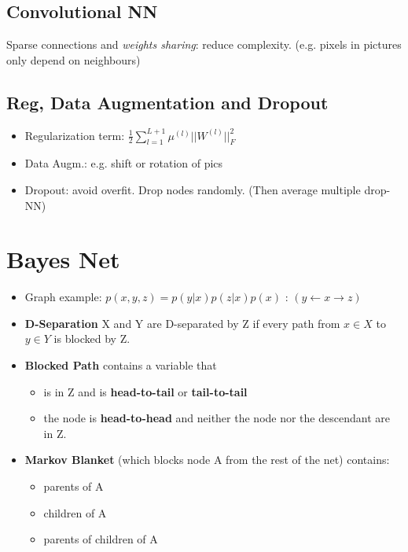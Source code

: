  
\subsection{Convolutional NN} 

Sparse connections and \textit{weights sharing}: reduce complexity. (e.g. pixels in pictures only depend on neighbours)

 
\subsection{Reg, Data Augmentation and Dropout}

\begin{itemize}
	\item Regularization term: $\frac{1}{2} \sum_{l=1}^{L+1} \mu^{(l)} || W ^{(l)} ||  ^{2} _{F}$
	\item Data Augm.: e.g. shift or rotation of pics
	\item Dropout: avoid overfit. Drop nodes randomly. (Then average multiple drop-NN)
\end{itemize}


\section{Bayes Net}
\begin{itemize}
	\item Graph example: $p(x, y, z) = p(y | x) p(z | x) p(x)$ : $(y \leftarrow x \rightarrow z)$ 
	\item \textbf{D-Separation} X and Y are D-separated by Z if every path from $ x \in X$ to $y \in Y$ is blocked by Z.
	\item \textbf{Blocked Path} contains a variable that
	\begin{itemize}
		\item is in Z and is \textbf{head-to-tail} or \textbf{tail-to-tail}
		\item the node is \textbf{head-to-head} and neither the node nor the descendant are in Z.
	\end{itemize}	
	\item \textbf{Markov Blanket} (which blocks node A from the rest of the net) contains:
	\begin{itemize}
		\item parents of A
		\item children of A
		\item parents of children of A
	\end{itemize}
	
\end{itemize}






